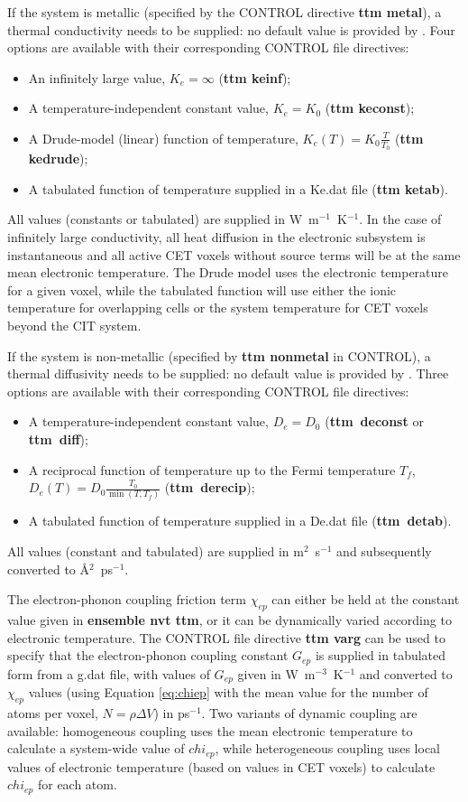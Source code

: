 If the system is metallic (specified by the CONTROL directive {\bf ttm metal}), 
a thermal conductivity needs to be supplied: no default value is provided by \D. 
Four options are available with their corresponding CONTROL file directives:
\begin{itemize}
\item An infinitely large value, $K_e = \infty$ ({\bf ttm keinf});
\item A temperature-independent constant value, $K_e = K_0$ ({\bf ttm keconst});
\item A Drude-model (linear) function of temperature, $K_e (T) = K_0 \frac{T}{T_0}$ ({\bf ttm kedrude});
\item A tabulated function of temperature supplied in a Ke.dat file ({\bf ttm ketab}).
\end{itemize}
All values (constants or tabulated) are supplied in W~m$^{-1}$~K$^{-1}$. 
In the case of infinitely large conductivity, all heat diffusion in the electronic 
subsystem is instantaneous and all active CET voxels without source terms 
will be at the same mean electronic temperature. The Drude model uses the 
electronic temperature for a given voxel, while the tabulated function will use 
either the ionic temperature for overlapping cells or the system temperature 
for CET voxels beyond the CIT system. 

If the system is non-metallic (specified by {\bf ttm nonmetal} in CONTROL), 
a thermal diffusivity needs to be supplied: no default value is provided by \D. 
Three options are available with their corresponding CONTROL file directives:
\begin{itemize}
\item A temperature-independent constant value, $D_e = D_0$ ({\bf ttm~deconst} or {\bf ttm~diff});
\item A reciprocal function of temperature up to the Fermi temperature $T_{f}$, $D_e (T) = D_0 \frac{T_0}{\min \left(T, T_{f}\right)}$ ({\bf ttm~derecip});
\item A tabulated function of temperature supplied in a De.dat file ({\bf ttm~detab}).
\end{itemize}
All values (constant and tabulated) are supplied in m$^2$~s$^{-1}$ and 
subsequently converted to \AA$^2$~ps$^{-1}$.

The electron-phonon coupling friction term $\chi_{ep}$ can either be held at 
the constant value given in {\bf ensemble nvt ttm}, or it can be dynamically 
varied according to electronic temperature. The CONTROL file directive 
{\bf ttm varg} can be used to specify that the electron-phonon coupling 
constant $G_{ep}$ is supplied in tabulated form from a g.dat file, with 
values of $G_{ep}$ given in W~m$^{-3}$~K$^{-1}$ and converted to 
$\chi_{ep}$ values (using Equation \ref{eq:chiep} with the mean value for 
the number of atoms per voxel, $N = \rho \Delta V$) in ps$^{-1}$. Two 
variants of dynamic coupling are available: homogeneous coupling 
uses the mean electronic temperature to calculate a system-wide value 
of $chi_{ep}$, while heterogeneous coupling uses local values of 
electronic temperature (based on values in CET voxels) to calculate 
$chi_{ep}$ for each atom.

